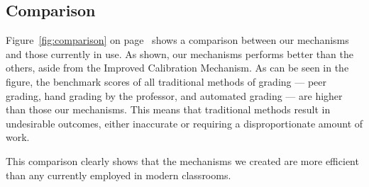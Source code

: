 \documentclass[12pt, Arial]{article}
\begin{document}
\subsection{Comparison}
Figure~\ref{fig:comparison} on page~\pageref{fig:comparison} shows a comparison between our mechanisms and those currently in use. As shown, our mechanisms performs better than the others, aside from the Improved Calibration Mechanism. As can be seen in the figure, the benchmark scores of all traditional methods of grading --- peer grading, hand grading by the professor, and automated grading --- are higher than those our mechanisms. This means that traditional methods result in undesirable outcomes, either inaccurate or requiring a disproportionate amount of work.

This comparison clearly shows that the mechanisms we created are more efficient than any currently employed in modern classrooms.
\newpage
\end{document}
